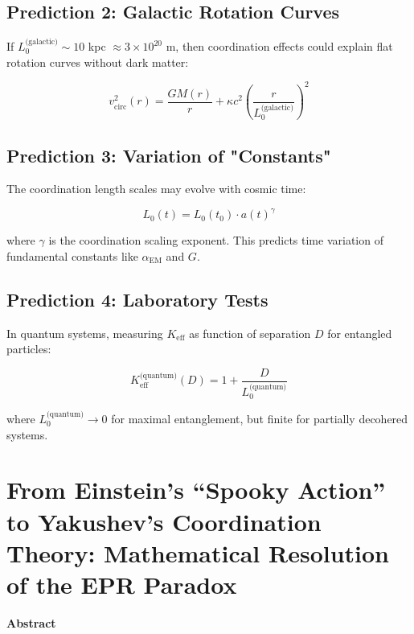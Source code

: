 \documentclass[11pt,a4paper]{article}
\begin{document}
	\subsection{Prediction 2: Galactic Rotation Curves}
	
	If $L_0^{\text{(galactic)}} \sim 10$ kpc $\approx 3\times10^{20}$ m, then 
	coordination effects could explain flat rotation curves without dark matter:
	
	\begin{equation}
		v_{\text{circ}}^2(r) = \frac{GM(r)}{r} + \kappa c^2 \left(\frac{r}{L_0^{\text{(galactic)}}}\right)^2
	\end{equation}
	
	\subsection{Prediction 3: Variation of "Constants"}
	
	The coordination length scales may evolve with cosmic time:
	
	\begin{equation}
		L_0(t) = L_0(t_0) \cdot a(t)^\gamma
	\end{equation}
	
	where $\gamma$ is the coordination scaling exponent. This predicts 
	time variation of fundamental constants like $\alpha_{\text{EM}}$ and $G$.
	
	\subsection{Prediction 4: Laboratory Tests}
	
	In quantum systems, measuring $K_{\mathrm{eff}}$ as function of 
	separation $D$ for entangled particles:
	
	\begin{equation}
		K_{\mathrm{eff}}^{\text{(quantum)}}(D) = 1 + \frac{D}{L_0^{\text{(quantum)}}}
	\end{equation}
	
	where $L_0^{\text{(quantum)}} \to 0$ for maximal entanglement, but 
	finite for partially decohered systems.
	
	\section{From Einstein's ``Spooky Action'' to Yakushev's Coordination Theory: Mathematical Resolution of the EPR Paradox}
	\label{sec:einstein-paradox}
	
	\begin{center}
		\textbf{Abstract}
	\end{center}
	
\end{document}
